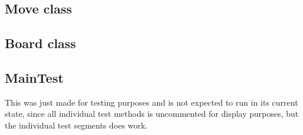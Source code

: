 \documentclass[12pt, a4paper]{article}
\begin{document}
\subsection{Move class}

\newpage
\subsection{Board class}

\newpage
\subsection{MainTest}
This was just made for testing purposes and is not expected to run in its current state, since all individual test methods is uncommented for display purposes, but the individual test segments does work.

\end{document}
